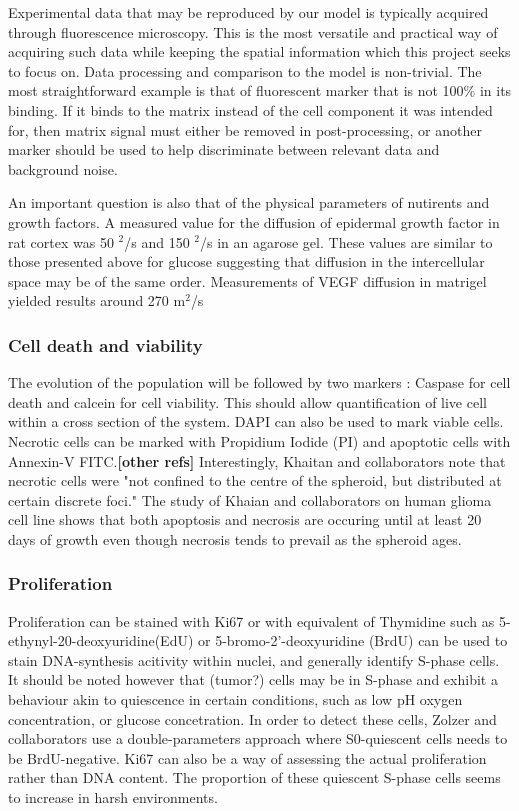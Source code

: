 \documentclass[11pt,a4paper]{article}
\begin{document}
Experimental data that may be reproduced by our model is typically acquired through fluorescence microscopy. This is the most versatile and practical way of acquiring such data while keeping the spatial information which this project seeks to focus on. Data processing and comparison to the model is non-trivial. The most straightforward example is that of fluorescent marker that is not 100\% in its binding. If it binds to the matrix instead of the cell component it was intended for, then matrix signal must either be removed in post-processing, or another marker should be used to help discriminate between relevant data and background noise.

An important question is also that of the physical parameters of nutirents and growth factors. A measured value for the diffusion of epidermal growth factor in rat cortex was 50 \textmu $^2$/s and 150  \textmu $^2$/s in an agarose gel. These values are similar to those presented above for glucose suggesting that diffusion in the intercellular space may be of the same order. Measurements of VEGF diffusion in matrigel yielded results around 270 \textmu m$^2$/s 

\subsubsection{Cell death and viability}
The evolution of the population will be followed by two markers : Caspase for cell death and calcein for cell viability. This should allow quantification of live cell within a cross section of the system. DAPI can also be used to mark viable cells.
Necrotic cells can be marked with Propidium Iodide (PI)  and apoptotic cells with Annexin-V FITC.\cite{Khaitan2006}\textbf{[other refs]} Interestingly, Khaitan and collaborators note that necrotic cells were "not confined to the centre of the spheroid, but distributed at certain discrete foci."\cite{Khaitan2006} The study of Khaian and collaborators on human glioma cell line shows that both apoptosis and necrosis are occuring until at least 20 days of growth even though necrosis tends to prevail as the spheroid ages. 

\subsubsection{Proliferation}
Proliferation can be stained with Ki67 \cite{Grimes2014}\cite{Ghaffarizadeh2017} or with equivalent of Thymidine such as 5-ethynyl-20-deoxyuridine(EdU) or 5-bromo-2'-deoxyuridine (BrdU) can be used to stain DNA-synthesis acitivity within nuclei, and generally identify S-phase cells. It should be noted however that (tumor?) cells may be in S-phase and exhibit a behaviour akin to quiescence in certain conditions, such as low pH oxygen concentration, or glucose concetration. \cite{Zolzer1999}\cite{Khaitan2006} In order to detect these cells, Zolzer and collaborators use a double-parameters approach where S0-quiescent cells needs to be BrdU-negative. Ki67 can also be a way of assessing the actual proliferation rather than DNA content. The proportion of these quiescent S-phase cells seems to increase in harsh environments.
 
\end{document}

